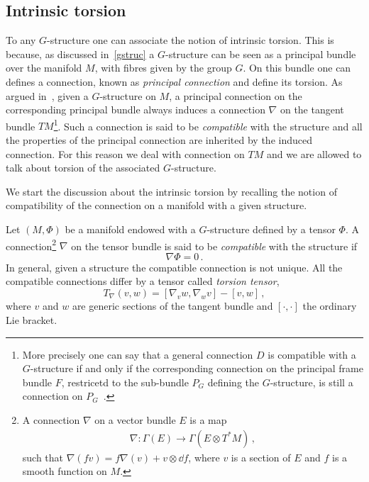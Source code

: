 \documentclass[debug]{phd}
\begin{document}
			\subsection{Intrinsic torsion}
					To any $G$-structure one can associate the notion of intrinsic torsion.
					This is because, as discussed in~\cref{gstruc} a $G$-structure can be seen as a principal bundle over the manifold $M$, with fibres given by the group $G$.
					On this bundle one can defines a connection, known as \emph{principal connection} and define its torsion.
					As argued in~\cite{joyce}, given a $G$-structure on $M$, a principal connection on the corresponding principal bundle always induces a connection $\nabla$ on the tangent bundle $TM$\footnote{%
						More precisely one can say that a general connection $D$ is compatible with a $G$-structure if and only if the corresponding connection on the principal frame bundle $F$, restricetd to the sub-bundle $P_G$ defining the $G$-structure, is still a connection on $P_G$~\cite{koba}.
						}.
					Such a connection is said to be \emph{compatible} with the structure and all the properties of the principal connection are inherited by the induced connection.
					For this reason we deal with connection on $TM$ and we are allowed to talk about torsion of the associated $G$-structure.
					
					We start the discussion about the intrinsic torsion by recalling the notion of compatibility of the connection on a manifold with a given structure.
					
					Let $(M,\Phi)$ be a manifold endowed with a $G$-structure defined by a tensor $\Phi$. A connection\footnote{%
						A connection $\nabla$ on a vector bundle $E$ is a map
								\begin{align*}
									\nabla : \Gamma\left(E\right) \rightarrow \Gamma\left(E \otimes T^*M \right)\, ,
								\end{align*}
						such that $\nabla(f v) = f \nabla(v) + v \otimes \dd f$, where $v$ is a section of $E$ and $f$ is a smooth function on $M$.%
						}	
					$\nabla$ on the tensor bundle is said to be \emph{compatible} with the structure if
							\begin{equation}
								\nabla \Phi = 0 \, .
							\end{equation}
					In general, given a structure the compatible connection is not unique.
					All the compatible connections differ by a tensor called \emph{torsion tensor},
							\begin{equation}\label{torsmap}
								T_{\nabla} (v,w) = \left[\nabla_v w , \nabla_w v \right] - \left[v , w \right]\, ,
							\end{equation}
					where $v$ and $w$ are generic sections of the tangent bundle and $[ \cdot, \cdot]$ the ordinary Lie bracket.
					
\end{document}
